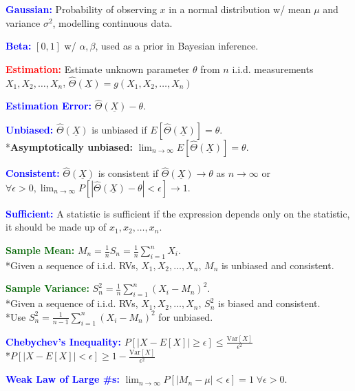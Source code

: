 \documentclass[5pt]{extarticle} %
\begin{document}
\begin{paracol}{3}
{    \textcolor{blue}{\textbf{Gaussian:}} Probability of observing $x$ in a normal distribution w/ mean $\mu$ and variance $\sigma^2$, modelling continuous data.

    \textcolor{blue}{\textbf{Beta:}} $[0,1]$ w/ $\alpha,\beta$, used as a prior in Bayesian inference. 

    \textcolor{red}{\textbf{Estimation:}} Estimate unknown parameter $\theta$ from $n$ i.i.d. measurements $X_1, X_2, \ldots, X_n$, $\hat{\Theta}(\underline{X}) = g(X_1, X_2, \ldots, X_n)$

    \textcolor{blue}{\textbf{Estimation Error:}} $\hat{\Theta}(\underline{X}) - \theta$. 

    \textcolor{blue}{\textbf{Unbiased:}} $\hat{\Theta}(\underline{X})$ is unbiased if $E[\hat{\Theta}(\underline{X})] = \theta$. \\
    *\textbf{Asymptotically unbiased:} $\lim_{n \to \infty} E[\hat{\Theta}(\underline{X})] = \theta$.

    \textcolor{blue}{\textbf{Consistent:}} $\hat{\Theta}(\underline{X})$ is consistent if $\hat{\Theta}(\underline{X}) \rightarrow \theta$ as $n \to \infty$ or $\forall \epsilon >0, \lim_{n \to \infty} P[|\hat{\Theta}(\underline{X}) - \theta| < \epsilon] \rightarrow 1$.

    \textcolor{blue}{\textbf{Sufficient:}} A statistic is sufficient if the expression depends only on the statistic, it should be made up of $x_1, x_2, \ldots, x_n$.

    \textcolor{darkgreen}{\textbf{Sample Mean:}} $M_n = \frac{1}{n} S_n = \frac{1}{n} \sum_{i=1}^n X_i$. \\
    *Given a sequence of i.i.d. RVs, $X_1, X_2, \ldots, X_n$, $M_n$ is unbiased and consistent.

    \textcolor{darkgreen}{\textbf{Sample Variance:}} $S_n^2 = \frac{1}{n} \sum_{i=1}^n (X_i - M_n)^2$. \\
    *Given a sequence of i.i.d. RVs, $X_1, X_2, \ldots, X_n$, $S_n^2$ is biased and consistent. \\
    *Use $S_n^2 = \frac{1}{n-1} \sum_{i=1}^n (X_i - M_n)^2$ for unbiased.

    \textcolor{blue}{\textbf{Chebychev's Inequality:}} $P[|X - E[X]| \geq \epsilon] \leq \frac{\text{Var}[X]}{\epsilon^2}$ \\
    *$P[|X - E[X] | < \epsilon] \geq 1 - \frac{\text{Var}[X]}{\epsilon^2}$

    \textcolor{blue}{\textbf{Weak Law of Large \#s:}} $\lim_{n \to \infty} P[|M_n - \mu| < \epsilon] = 1 \; \forall \epsilon > 0$.

}
\end{paracol}
\end{document}
